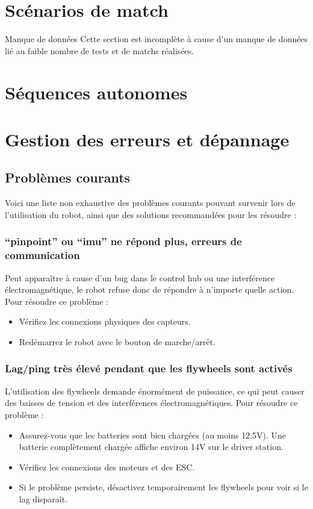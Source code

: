 \documentclass[12pt, a4paper]{report}
\begin{document}
    \section{Scénarios de match}

    \begin{myinfo}{Manque de données}
        Cette section est incomplète à cause d'un manque de données lié au faible nombre de tests et de matchs réalisées.
    \end{myinfo}


    \section{Séquences autonomes}


    \section{Gestion des erreurs et dépannage}

    \subsection{Problèmes courants}
    Voici une liste non exhaustive des problèmes courants pouvant survenir lors de l'utilisation du robot, ainsi que des solutions recommandées pour les résoudre :

    \subsubsection{\enquote{pinpoint} ou \enquote{imu} ne répond plus, erreurs de communication}
    Peut apparaître à cause d'un bug dans le control hub ou une interférence électromagnétique, le robot refuse donc de répondre à n'importe quelle action. Pour résoudre ce problème :
    \begin{itemize}
        \item Vérifiez les connexions physiques des capteurs.
        \item Redémarrez le robot avec le bouton de marche/arrêt.
    \end{itemize}

    \subsubsection{Lag/ping très élevé pendant que les flywheels sont activés}

    L'utilisation des flywheels demande énormément de puissance, ce qui peut causer des baisses de tension et des interférences électromagnétiques. Pour résoudre ce problème :
    \begin{itemize}
        \item Assurez-vous que les batteries sont bien chargées (au moins 12.5V). Une batterie complètement chargée affiche environ 14V sur le driver station.
        \item Vérifiez les connexions des moteurs et des ESC.
        \item Si le problème persiste, désactivez temporairement les flywheels pour voir si le lag disparaît.
    \end{itemize}
\end{document}
